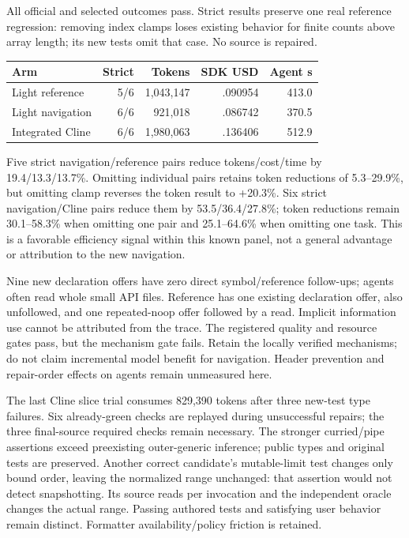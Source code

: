 \documentclass[11pt,a4paper]{article}
\begin{document}
All official and selected outcomes pass. Strict results preserve one real
reference regression: removing index clamps loses existing behavior for finite
counts above array length; its new tests omit that case. No source is repaired.
\begin{center}\begin{tabular}{lrrrr}
\toprule Arm & Strict & Tokens & SDK USD & Agent s \\\midrule
Light reference & 5/6 & 1,043,147 & .090954 & 413.0 \\
Light navigation & 6/6 & 921,018 & .086742 & 370.5 \\
Integrated Cline & 6/6 & 1,980,063 & .136406 & 512.9 \\\bottomrule
\end{tabular}\end{center}
Five strict navigation/reference pairs reduce tokens/cost/time by
19.4/13.3/13.7\%. Omitting individual pairs retains token reductions of
5.3--29.9\%, but omitting clamp reverses the token result to +20.3\%.
Six strict navigation/Cline pairs reduce them by 53.5/36.4/27.8\%; token
reductions remain 30.1--58.3\% when omitting one pair and 25.1--64.6\% when
omitting one task. This is a favorable efficiency signal within this known
panel, not a general advantage or attribution to the new navigation.

Nine new declaration offers have zero direct symbol/reference follow-ups;
agents often read whole small API files. Reference has one existing declaration
offer, also unfollowed, and one repeated-noop offer followed by a read. Implicit
information use cannot be attributed from the trace. The registered quality
and resource gates pass, but the mechanism gate fails. Retain the locally
verified mechanisms; do not claim incremental model benefit for navigation.
Header prevention and repair-order effects on agents remain unmeasured here.

The last Cline slice trial consumes 829,390 tokens after three new-test type
failures. Six already-green checks are replayed during unsuccessful repairs;
the three final-source required checks remain necessary. The stronger curried/pipe assertions
exceed preexisting outer-generic inference; public types and original tests
are preserved. Another correct candidate's mutable-limit test changes only
bound order, leaving the normalized range unchanged: that assertion would not
detect snapshotting. Its source reads per invocation and the independent oracle
changes the actual range. Passing authored tests and satisfying user behavior
remain distinct. Formatter availability/policy friction is retained.
\end{document}
